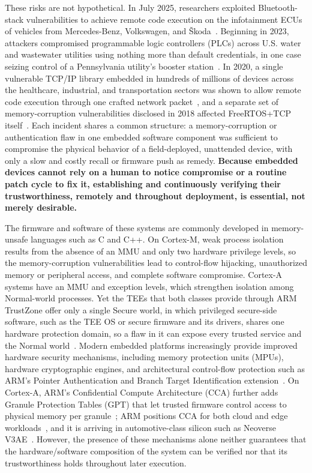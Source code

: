 These risks are not hypothetical.
In July 2025, researchers exploited Bluetooth-stack vulnerabilities to achieve remote code execution on the infotainment ECUs of vehicles from Mercedes-Benz, Volkswagen, and \v{S}koda~\cite{perfektblue2025}.
Beginning in 2023, attackers compromised programmable logic controllers (PLCs) across U.S. water and wastewater utilities using nothing more than default credentials, in one case seizing control of a Pennsylvania utility's booster station~\cite{cisa2023unitronics}.
In 2020, a single vulnerable TCP/IP library embedded in hundreds of millions of devices across the healthcare, industrial, and transportation sectors was shown to allow remote code execution through one crafted network packet~\cite{cisa2020ripple20}, and a separate set of memory-corruption vulnerabilities disclosed in 2018 affected FreeRTOS+TCP itself~\cite{zimperium2018freertos}.
Each incident shares a common structure: a memory-corruption or authentication flaw in one embedded software component was sufficient to compromise the physical behavior of a field-deployed, unattended device, with only a slow and costly recall or firmware push as remedy.
\textbf{Because embedded devices cannot rely on a human to notice compromise or a routine patch cycle to fix it, establishing and continuously verifying their trustworthiness, remotely and throughout deployment, is essential, not merely desirable.}

The firmware and software of these systems are commonly developed in memory-unsafe languages such as C and C++.
On Cortex-M, weak process isolation results from the absence of an MMU and only two hardware privilege levels, so the memory-corruption vulnerabilities lead to control-flow hijacking, unauthorized memory or peripheral access, and complete software compromise.
Cortex-A systems have an MMU and exception levels, which strengthen isolation among Normal-world processes.
Yet the TEEs that both classes provide through ARM TrustZone offer only a single Secure world, in which privileged secure-side software, such as the TEE OS or secure firmware and its drivers, shares one hardware protection domain, so a flaw in it can expose every trusted service and the Normal world~\cite{pinto2019demystifying,cerdeira2020sok,cerdeira2022rezone,kuhne2024aster}.
Modern embedded platforms increasingly provide improved hardware security mechanisms, including memory protection units (MPUs), hardware cryptographic engines, and architectural control-flow protection such as ARM's Pointer Authentication and Branch Target Identification extension~\cite{m85}.
On Cortex-A, ARM's Confidential Compute Architecture (CCA) further adds Granule Protection Tables (GPT) that let trusted firmware control access to physical memory per granule~\cite{li2022design}; ARM positions CCA for both cloud and edge workloads~\cite{armcca}, and it is arriving in automotive-class silicon such as Neoverse V3AE~\cite{arm2024v3ae}.
However, the presence of these mechanisms alone neither guarantees that the hardware/software composition of the system can be verified nor that its trustworthiness holds throughout later execution.

